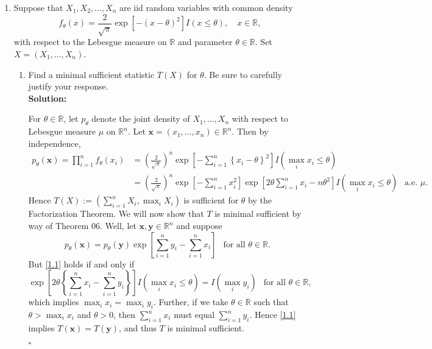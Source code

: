 \documentclass[12pt]{article}
\newcounter{ProofCounter}
\newenvironment{Solution}{\stepcounter{ProofCounter}\textbf{Solution:}}{\hfill$\square$}
\def\t{\theta}
\begin{document}
\begin{enumerate}[leftmargin=0cm, itemindent=0cm]





\item Suppose that $X_1,X_2,\ldots,X_n$ are iid random variables with common density
\[
f_\theta(x) = \frac{2}{\sqrt{\pi}} \exp\left[-(x-\theta)^2\right] I(x \leq \theta),\quad x\in\mathbb{R},
\]
with respect to the Lebesgue measure on $\mathbb{R}$ and parameter $\theta \in \mathbb{R}$.
Set $X=(X_1,\ldots,X_n)$.

\begin{enumerate}[leftmargin=0cm, itemindent=0cm]
\item Find a minimal sufficient statistic $T(X)$ for $\theta$.  Be sure to carefully justify your response. \\

  \begin{Solution}

  For $\theta \in \mathbb{R}$, let $p_{\theta}$ denote the joint density of $X_1, \dots , X_n$ with respect to Lebesgue measure $\mu$ on
  $\mathbb{R}^n$.
  Let $\bm{x} = (x_1, \dots, x_n) \in \mathbb{R}^{n}$. Then by independence,
  \begin{align*}
    p_{\theta}(\bm{x}) = \prod_{i=1}^{n}f_{\theta}(x_i) & = \left( \frac{2}{\sqrt{\pi}} \right)^{n}\exp\left[ -\sum_{i=1}^{n}\left\{ x_i - \theta
    \right\}^2 \right]I(\max_i x_i \leq \t) \\
    & = \left( \frac{2}{\sqrt{\pi}} \right)^{n} \exp\left[ -\sum_{i=1}^{n}x_i^2 \right]\exp\left[ 2\theta\sum_{i=1}^{n}x_i - n\theta^2 \right]I(\max_i
    x_i \leq \t) \ \ \text{ a.e. } \mu.
  \end{align*}
  Hence $T(X) := \left( \sum_{i=1}^{n}X_i, \max_i X_i \right)$ is sufficient for $\theta$ by the Factorization Theorem. We will now show that $T$ is minimal sufficient by way
  of Theorem 06. Well, let $\bm{x}, \bm{y} \in \mathbb{R}^{n}$ and suppose 
  \begin{equation}
    p_{\theta}(\bm{x}) = p_{\theta}(\bm{y}) \exp\left[ \sum_{i=1}^{n}y_i - \sum_{i=1}^{n}x_i \right] \ \ \text{ for all } \theta \in \mathbb{R}.
    \label{1.1}
  \end{equation}
  But \eqref{1.1} holds if and only if
  \[
    \exp\left[ 2\theta\left\{ \sum_{i=1}^{n}x_i - \sum_{i=1}^{n}y_i \right\} \right]I(\max_i x_i \leq \theta) = I(\max_i y_i) \ \ \text{ for all } \theta
    \in \mathbb{R},
  \]
  which implies $\max_i x_i = \max_i y_i$. Further, if we take $\theta \in \mathbb{R}$ such that $\theta > \max_i x_i$ and $\theta > 0$, then $\sum_{i=1}^{n}x_i$ must equal $\sum_{i=1}^{n}y_i$.
  Hence \eqref{1.1} implies $T(\bm{x}) = T(\bm{y})$, and thus $T$ is minimal sufficient.


\end{Solution}
\end{enumerate}
\end{enumerate}
\end{document}
